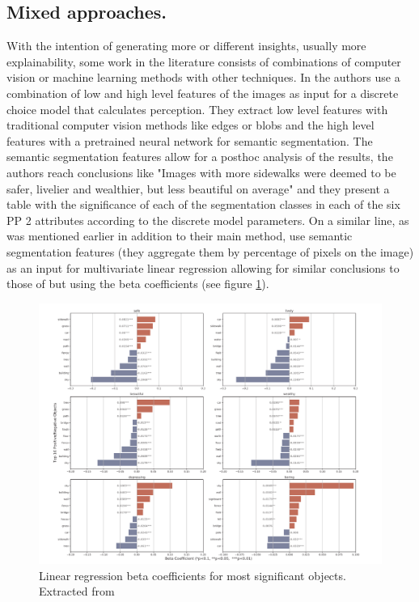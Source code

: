 \subsection{Mixed approaches.}

With the intention of generating more or different insights, usually more explainability, some
work in the literature consists of combinations of computer vision or machine learning methods
with other techniques. In  the authors use a combination of low and high level features
of the images as input for a discrete choice model that calculates perception. They extract low level features
with traditional computer vision methods like edges or blobs and the high level features with a pretrained
neural network for semantic segmentation. The semantic segmentation features allow for a posthoc analysis of
the results, the authors reach conclusions like "Images with more sidewalks were deemed to be
safer, livelier and wealthier, but less beautiful on average" and they present a table with the significance
of each of the segmentation classes in each of the six PP 2 attributes according to the discrete model parameters.
On a similar line, as was mentioned earlier  in addition to their main method, use
semantic segmentation features (they aggregate them by percentage of pixels on the image)
as an input for multivariate linear regression allowing for similar conclusions to those of 
but using the beta coefficients (see figure \ref{fig:beta}).

\begin{figure}[ht]
	\begin{center}
	\includegraphics[width=1\textwidth]{./figures/zhang.png}
	\caption[Beta Coefficients]{ Linear regression beta coefficients for most significant objects. Extracted from  }
	\label{fig:beta}
	\end{center}
\end{figure}

